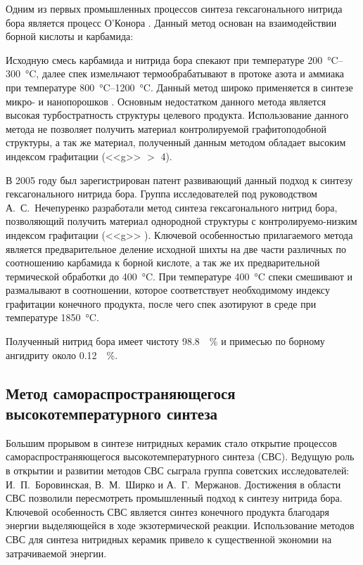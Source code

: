 Одним из первых промышленных процессов синтеза гексагонального нитрида бора является
процесс О'Конора \cite[]{edmond_process_1966}. Данный метод основан на взаимодействии 
борной кислоты и карбамида:


Исходную смесь карбамида и нитрида бора спекают при температуре 
\SIrange{200}{300}{\degreeCelsius}, далее спек измельчают термообрабатывают в протоке 
азота и аммиака при температуре \SIrange{800}{1200}{\degreeCelsius}. Данный метод
широко применяется в синтезе микро- и нанопорошков . Основным недостатком
данного метода является высокая турбостратность структуры целевого продукта.
Использование данного метода не позволяет получить материал контролируемой 
графитоподобной структуры, а так же материал, полученный данным методом 
обладает высоким индексом графитации (<<g>> $>$ 4).  


В 2005 году был зарегистрирован патент \cite[]{_ru__2005} развивающий данный 
подход к синтезу гексагонального нитрида бора. Группа исследователей под
руководством А.~С.~Нечепуренко разработали метод синтеза гексагонального нитрид
бора, позволяющий получить материал однородной структуры с контролируемо-низким
индексом графитации (<<g>> ). Ключевой особенностью прилагаемого метода
является предварительное деление исходной шихты  на две части 
различных по соотношению карбамида к борной кислоте, а так же их предварительной
термической обработки до \SI{400}{\degreeCelsius}. При температуре \SI{400}{\degreeCelsius}
спеки смешивают и размалывают в соотношении, которое соответствует необходимому 
индексу графитации конечного продукта, после чего спек азотируют в среде 
при температуре \SI{1850}{\degreeCelsius}.

Полученный нитрид бора имеет чистоту \SI{98.8}{\%} и примесью по 
борному ангидриту около \SI{0.12}{\%}.

\subsection{Метод самораспространяющегося высокотемпературного синтеза}%
\label{sub:Метод самораспространяющегося высокотемпературного синтеза}

Большим прорывом в синтезе нитридных керамик стало открытие процессов
самораспространяющегося высокотемпературного синтеза (СВС). Ведущую роль
в открытии и развитии методов СВС сыграла группа советских
исследователей: И.~П.~Боровинская, В.~М.~Ширко и А.~Г.~Мержанов. Достижения
в области СВС позволили пересмотреть промышленный подход к синтезу нитрида
бора. Ключевой особенность СВС является синтез конечного продукта благодаря
энергии выделяющейся в ходе экзотермической реакции. Использование методов 
СВС для синтеза нитридных керамик привело к существенной экономии на затрачиваемой
энергии.

